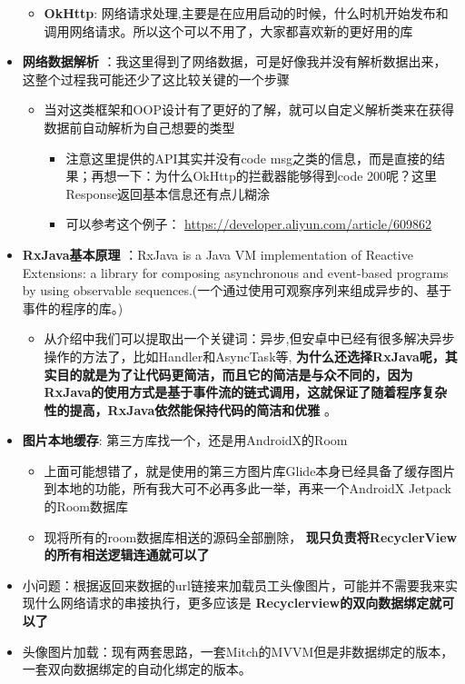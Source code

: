 \documentclass[9pt, b5paper]{article}
\begin{document}
\begin{itemize}
\begin{itemize}
\item \textbf{OkHttp}: 网络请求处理,主要是在应用启动的时候，什么时机开始发布和调用网络请求。所以这个可以不用了，大家都喜欢新的更好用的库
\end{itemize}
\item \textbf{网络数据解析} ：我这里得到了网络数据，可是好像我并没有解析数据出来，这整个过程我可能还少了这比较关键的一个步骤
\begin{itemize}
\item 当对这类框架和OOP设计有了更好的了解，就可以自定义解析类来在获得数据前自动解析为自己想要的类型
\begin{itemize}
\item 注意这里提供的API其实并没有code msg之类的信息，而是直接的结果；再想一下：为什么OkHttp的拦截器能够得到code 200呢？这里Response返回基本信息还有点儿糊涂
\item 可以参考这个例子： \url{https://developer.aliyun.com/article/609862}
\end{itemize}
\end{itemize}
\item \textbf{RxJava基本原理} ：RxJava is a Java VM implementation of Reactive Extensions: a library for composing asynchronous and event-based programs by using observable sequences.(一个通过使用可观察序列来组成异步的、基于事件的程序的库。)
\begin{itemize}
\item 从介绍中我们可以提取出一个关键词：异步,但安卓中已经有很多解决异步操作的方法了，比如Handler和AsyncTask等, \textbf{为什么还选择RxJava呢，其实目的就是为了让代码更简洁，而且它的简洁是与众不同的，因为RxJava的使用方式是基于事件流的链式调用，这就保证了随着程序复杂性的提高，RxJava依然能保持代码的简洁和优雅} 。
\end{itemize}
\item \textbf{图片本地缓存}: 第三方库找一个，还是用AndroidX的Room
\begin{itemize}
\item 上面可能想错了，就是使用的第三方图片库Glide本身已经具备了缓存图片到本地的功能，所有我大可不必再多此一举，再来一个AndroidX Jetpack的Room数据库
\item 现将所有的room数据库相送的源码全部删除， \textbf{现只负责将RecyclerView的所有相送逻辑连通就可以了}
\end{itemize}
\item 小问题：根据返回来数据的url链接来加载员工头像图片，可能并不需要我来实现什么网络请求的串接执行，更多应该是 \textbf{Recyclerview的双向数据绑定就可以了}
\item 头像图片加载：现有两套思路，一套Mitch的MVVM但是非数据绑定的版本，一套双向数据绑定的自动化绑定的版本。

\end{itemize}
\end{document}
